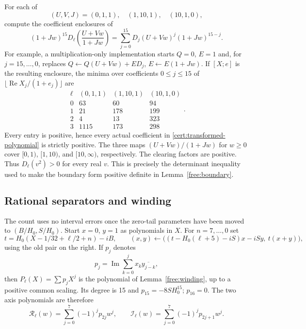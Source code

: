 For each of
\begin{equation}\label{cert:substitutions}
 (U,V,J)=(0,1,1),\quad(1,10,1),\quad(10,1,0),
\end{equation}
compute the coefficient enclosures of
\begin{equation}\label{cert:transformed-polynomial}
 (1+Jw)^{15}D_\ell\left(\frac{U+Vw}{1+Jw}\right)
 =\sum_{j=0}^{15}D_j(U+Vw)^j(1+Jw)^{15-j}.
\end{equation}
For example, a multiplication-only implementation starts $Q=0$, $E=1$
and, for $j=15,\ldots,0$, replaces
$Q\leftarrow Q(U+Vw)+ED_j$, $E\leftarrow E(1+Jw)$.
If $[X;e]$ is the resulting enclosure, the minima over coefficients
$0\le j\le15$ of $\lfloor\operatorname{Re}X_j/(1+e_j)\rfloor$ are
\begin{equation}\label{cert:boundary-table}
 \begin{array}{c|rrr}
 \ell&(0,1,1)&(1,10,1)&(10,1,0)\\\hline
 0&63&60&94\\
 1&21&178&199\\
 2&4&13&323\\
 3&1115&173&298
 \end{array}.
\end{equation}
Every entry is positive, hence every actual coefficient in
\eqref{cert:transformed-polynomial} is strictly positive.  The three
maps $(U+Vw)/(1+Jw)$ for $w\ge0$ cover $[0,1)$, $[1,10)$, and
$[10,\infty)$, respectively.  The clearing factors are positive.
Thus $D_\ell(v^2)>0$ for every real $v$.  This is precisely the
determinant inequality used to make the boundary form positive
definite in Lemma~\ref{free:boundary}.

\subsection{Rational separators and winding}\label{cert:winding}

The count uses no interval errors once the zero-tail parameters have
been moved to $(B/H_0,S/H_0)$.  Start $x=0$, $y=1$ as polynomials in
$X$.  For $n=7,\ldots,0$ set
\[
 t=H_0(X-1/32+\ell/2+n)-iB,
 \qquad
 (x,y)\leftarrow
 \big((t-H_0(\ell+5)-iS)x-iSy,\ t(x+y)\big),
\]
using the old pair on the right.  If $p_j$ denotes
\begin{equation}\label{cert:p-coefficients}
 p_j=\operatorname{Im}\sum_{k=0}^j x_k\overline{y_{j-k}},
\end{equation}
then $P_\ell(X)=\sum p_jX^j$ is the polynomial of
Lemma~\ref{free:winding}, up to a positive common scaling.
Its degree is 15 and $p_{15}=-8SH_0^{15}$; $p_{16}=0$.
The two axis polynomials are therefore
\[
 \mathcal R_\ell(w)=\sum_{j=0}^7(-1)^jp_{2j}w^j,
 \qquad
 \mathcal I_\ell(w)=\sum_{j=0}^7(-1)^jp_{2j+1}w^j.
\]

